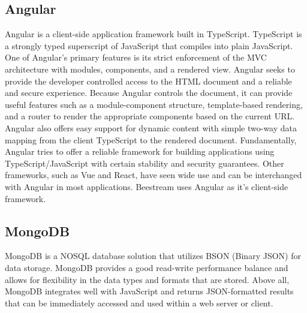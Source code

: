 \subsection{Angular}
Angular \cite{angular} is a client-side application framework built in TypeScript.  TypeScript \cite{typescript} is a strongly typed superscript of JavaScript that compiles into plain JavaScript.  One of Angular’s primary features is its strict enforcement of the MVC architecture with modules, components, and a rendered view.  Angular seeks to provide the developer controlled access to the HTML document and a reliable and secure experience.  Because Angular controls the document, it can provide useful features such as a module-component structure, template-based rendering, and a router to render the appropriate components based on the current URL.  Angular also offers easy support for dynamic content with simple two-way data mapping from the client TypeScript to the rendered document.  Fundamentally, Angular tries to offer a reliable framework for building applications using TypeScript/JavaScript with certain stability and security guarantees.  Other frameworks, such as Vue and React, have seen wide use and can be interchanged with Angular in most applications.  Beestream uses Angular as it’s client-side framework. \par

\subsection{MongoDB}
MongoDB \cite{mongo} is a NOSQL database solution that utilizes BSON (Binary JSON) for data storage.  MongoDB provides a good read-write performance balance and allows for flexibility in the data types and formats that are stored.  Above all, MongoDB integrates well with JavaScript and returns JSON-formatted results that can be immediately accessed and used within a web server or client. \par
